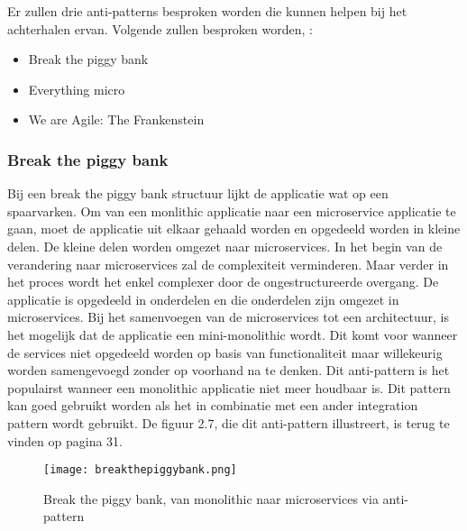 Er zullen drie anti-patterns besproken worden die kunnen helpen bij het achterhalen ervan. Volgende zullen besproken worden, \textcite{Monson2019}:
\begin{itemize}
	\item Break the piggy bank
	\item Everything micro
	\item We are Agile: The Frankenstein
\end{itemize}
\subsubsection{Break the piggy bank}
Bij een break the piggy bank structuur lijkt de applicatie wat op een spaarvarken. Om van een monlithic applicatie naar een microservice applicatie te gaan, moet de applicatie uit elkaar gehaald worden en opgedeeld worden in kleine delen.  De kleine delen worden omgezet naar microservices. 
In het begin van de verandering naar microservices zal de complexiteit verminderen. Maar  verder in het proces wordt het enkel complexer door de ongestructureerde overgang.
De applicatie is opgedeeld in onderdelen en die onderdelen zijn omgezet in microservices. Bij het samenvoegen van de microservices tot een architectuur, is het mogelijk dat de applicatie een mini-monolithic wordt. Dit komt voor wanneer de services niet opgedeeld worden op basis van functionaliteit maar willekeurig worden samengevoegd zonder op voorhand na te denken.
Dit anti-pattern is het populairst wanneer een monolithic applicatie niet meer houdbaar is. Dit pattern kan goed gebruikt worden als het in combinatie met een ander integration pattern wordt gebruikt.
De figuur 2.7, die dit anti-pattern illustreert, is terug te vinden op pagina 31.
\begin{figure}[h!]
	\texttt{[image: breakthepiggybank.png]}
	\centering
	\caption{Break the piggy bank, van monolithic naar microservices via anti-pattern \textcite{Monson2019}}
\end{figure}

